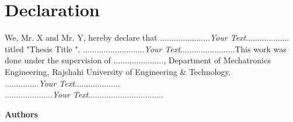 
\chapter*{Declaration}

We, Mr. X and Mr. Y, hereby declare that ......................\textit{Your Text}................... titled "Thesis Title ". ...........................\textit{Your Text}........................This work was done under the supervision of .......,.............., Department of Mechatronics Engineering, Rajshahi University of Engineering \& Technology.\\

...............\textit{Your Text}....................\\

.....................\textit{Your Text}.................................


\vspace{1in}

\begin{flushright}
\textbf{Authors}\\


\end{flushright}
